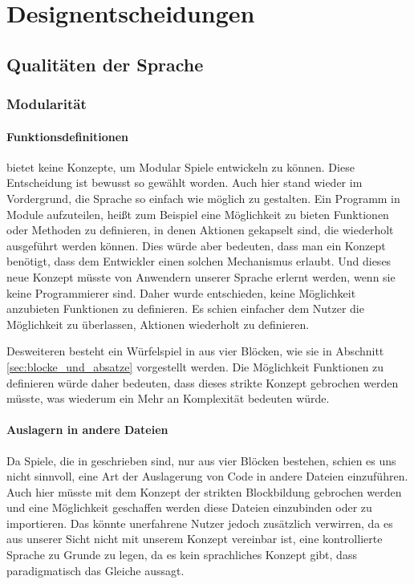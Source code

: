 
\chapter{Designentscheidungen}
\label{cha:designentscheidungen}

\section{Qualitäten der Sprache}
\label{sec:qualitaten_der_sprache}

	\subsection{Modularität}
	\label{sub:modularitat}

		\subsubsection{Funktionsdefinitionen}
		\label{subsub:funktionsdefinitionen}
			\dg bietet keine Konzepte, um Modular Spiele entwickeln zu können. Diese Entscheidung ist bewusst so gewählt worden. Auch hier stand wieder im Vordergrund, die Sprache so einfach wie möglich zu gestalten. Ein Programm in Module aufzuteilen, heißt zum Beispiel eine Möglichkeit zu bieten Funktionen oder Methoden zu definieren, in denen Aktionen gekapselt sind, die wiederholt ausgeführt werden können. Dies würde aber bedeuten, dass man ein Konzept benötigt, dass dem Entwickler einen solchen Mechanismus erlaubt. Und dieses neue Konzept müsste von Anwendern unserer Sprache erlernt werden, wenn sie keine Programmierer sind. Daher wurde entschieden, keine Möglichkeit anzubieten Funktionen zu definieren. Es schien einfacher dem Nutzer die Möglichkeit zu überlassen, Aktionen wiederholt zu definieren.

			Desweiteren besteht ein Würfelspiel in \dg aus vier Blöcken, wie sie in Abschnitt \ref{sec:blocke_und_absatze} vorgestellt werden. Die Möglichkeit Funktionen zu definieren würde daher bedeuten, dass dieses strikte Konzept gebrochen werden müsste, was wiederum ein Mehr an Komplexität bedeuten würde.

		\subsubsection{Auslagern in andere Dateien}
		\label{subsub:auslagern_in_andere_dateien}
			Da Spiele, die in \dg geschrieben sind, nur aus vier Blöcken bestehen, schien es uns nicht sinnvoll, eine Art der Auslagerung von Code in andere Dateien einzuführen. Auch hier müsste mit dem Konzept der strikten Blockbildung gebrochen werden und eine Möglichkeit geschaffen werden diese Dateien einzubinden oder zu importieren. Das könnte unerfahrene Nutzer jedoch zusätzlich verwirren, da es aus unserer Sicht nicht mit unserem Konzept vereinbar ist, \dg eine kontrollierte Sprache zu Grunde zu legen, da es kein sprachliches Konzept gibt, dass paradigmatisch das Gleiche aussagt.

